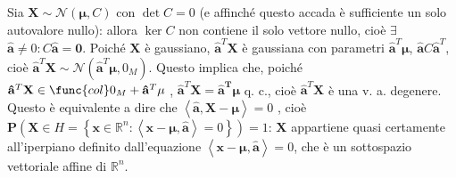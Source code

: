 \documentclass{article}
\begin{document}
Sia $\mathbf{X}\sim \mathcal{N}\left( \mathbf{\mu },C\right) $ con $\det C=0$
(e affinch\'{e} questo accada \`{e} sufficiente un solo autovalore nullo):
allora $\ker C$ non contiene il solo vettore nullo, cio\`{e} $\exists $ $%
\mathbf{\hat{a}}\neq 0:C\mathbf{\hat{a}=0}$. Poich\'{e} $\mathbf{X}$ \`{e}
gaussiano, $\mathbf{\hat{a}}^{T}\mathbf{X}$ \`{e} gaussiana con parametri $%
\mathbf{\hat{a}}^{T}\mathbf{\mu }$, $\mathbf{\hat{a}}C\mathbf{\hat{a}}^{T}$,
cio\`{e} $\mathbf{\hat{a}}^{T}\mathbf{X}\sim \mathcal{N}\left( \mathbf{\hat{a%
}}^{T}\mathbf{\mu },0_{M}\right) $. Questo implica che, poich\'{e} $\mathbf{%
\hat{a}}^{T}\mathbf{X}\in \func{col}0_{M}+\mathbf{\hat{a}}^{T}\mathbf{\mu }$%
, $\mathbf{\hat{a}}^{T}\mathbf{X=\mathbf{\hat{a}}^{T}\mu }$ q. c., cio\`{e} $%
\mathbf{\hat{a}}^{T}\mathbf{X}$ \`{e} una v. a. degenere. Questo \`{e}
equivalente a dire che $\left\langle \mathbf{\hat{a},X-\mu }\right\rangle =0$%
, cio\`{e} $\mathbf{P}\left( \mathbf{X}\in H=\left\{ \mathbf{x}\in 
\mathbb{R}
^{n}:\left\langle \mathbf{x-\mu },\mathbf{\hat{a}}\right\rangle =0\right\}
\right) =1$: $\mathbf{X}$ appartiene quasi certamente all'iperpiano definito
dall'equazione $\left\langle \mathbf{x-\mu },\mathbf{\hat{a}}\right\rangle
=0 $, che \`{e} un sottospazio vettoriale affine di $%
\mathbb{R}
^{n}$.
\end{document}
